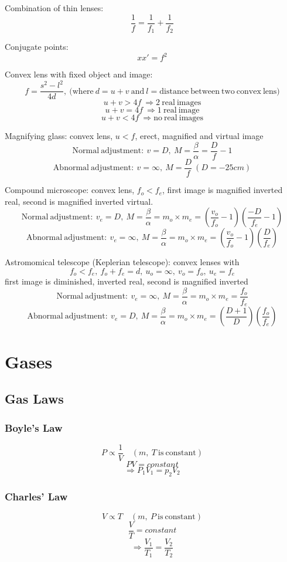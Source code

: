 \documentclass{article}
\begin{document}
Combination of thin lenses:
\[\frac{1}{f}=\frac{1}{f_1}+\frac{1}{f_2}\]

Conjugate points:
\[xx'=f^2\]

Convex lens with fixed object and image:
\[f=\frac{s^2-l^2}{4d},\ (\mathrm{where}\ d=u+v\ \mathrm{and}\ l=\mathrm{distance\ between\ two\ convex\ lens)}\]
\[u+v>4f\ \Rightarrow\mathrm{2\ real\ images}\]
\[u+v=4f\ \Rightarrow\mathrm{1\ real\ image}\]
\[u+v<4f\ \Rightarrow\mathrm{no\ real\ images}\]

Magnifying glass: convex lens, \(u<f\), erect, magnified and virtual image
\[\mathrm{Normal\ adjustment:}\ v=D,\ M=\frac{\beta}{\alpha}=\frac{D}{f}-1\]
\[\mathrm{Abnormal\ adjustment:}\ v=\infty,\ M=\frac{D}{f}\ (D=-25cm)\]

Compound microscope: convex lens, \(f_o<f_e\), first image is magnified inverted real, second is magnified inverted virtual.
\[\mathrm{Normal\ adjustment:}\ v_e=D,\ M=\frac{\beta}{\alpha}=m_o\times m_e=(\frac{v_o}{f_o}-1)(\frac{-D}{f_e}-1)\]
\[\mathrm{Abnormal\ adjustment:}\ v_e=\infty,\ M=\frac{\beta}{\alpha}=m_o\times m_e=(\frac{v_o}{f_o}-1)(\frac{D}{f_e})\]

Astromomical telescope (Keplerian telescope): convex lenses with
\[f_o<f_e,\ f_o+f_e=d,\ u_o=\infty,\ v_o=f_o,\ u_e=f_e\] first image is diminished, inverted real, second is magnified inverted
\[\mathrm{Normal\ adjustment:}\ v_e=\infty,\ M=\frac{\beta}{\alpha}=m_o\times m_e=\frac{f_o}{f_e}\]
\[\mathrm{Abnormal\ adjustment:}\ v_e=D,\ M=\frac{\beta}{\alpha}=m_o\times m_e=(\frac{D+1}{D})(\frac{f_o}{f_e})\]

\section{Gases}
\subsection*{Gas Laws}

\subsubsection*{Boyle's Law}
\[P\propto\frac{1}{V}\quad(m,\ T\ \mathrm{is\ constant})\]
\[PV=constant\]
\[\Rightarrow P_1V_1=p_2V_2\]

\subsubsection*{Charles' Law}
\[V\propto T\quad(m,\ P\ \mathrm{is\ constant})\]
\[\frac{V}{T}=constant\]
\[\Rightarrow \frac{V_1}{T_1}=\frac{V_2}{T_2}\]
\end{document}
